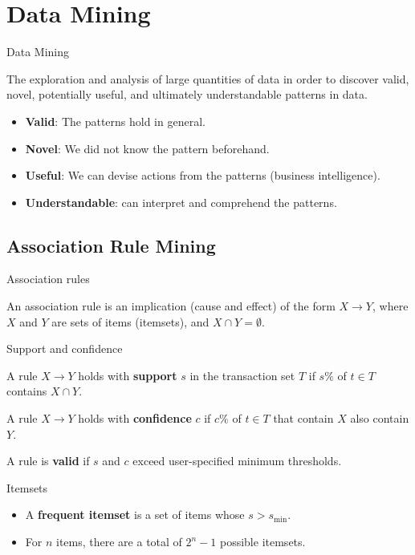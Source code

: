 \section{Data Mining}

\begin{definition}
    {Data Mining}

    The exploration and analysis of large quantities of data in order to discover valid, novel, potentially useful, and ultimately understandable patterns in data.

    \begin{itemize}
        \item \textbf{Valid}: The patterns hold in general.
        \item \textbf{Novel}: We did not know the pattern beforehand.
        \item \textbf{Useful}: We can devise actions from the patterns (business intelligence).
        \item \textbf{Understandable}: can interpret and comprehend the patterns.
    \end{itemize}

\end{definition}

\subsection{Association Rule Mining}

\begin{knBox}
    {Association rules}

    An association rule is an implication (cause and effect) of the form $X \rightarrow Y$, where $X$ and $Y$ are sets of items (itemsets), and $X \cap Y = \emptyset$.
\end{knBox}

\begin{definition}
    {Support and confidence}

    A rule $X \to Y$ holds with \textbf{support} $s$ in the transaction set $T$ if $s\%$ of $t \in T$ contains $X \cap Y$.

    A rule $X \to Y$ holds with \textbf{confidence} $c$ if $c\%$ of $t \in T$ that contain $X$ also contain $Y$.

    A rule is \textbf{valid} if $s$ and $c$ exceed user-specified minimum thresholds.
\end{definition}

\begin{definition}
    {Itemsets}

    \begin{itemize}
        \item A \textbf{frequent itemset} is a set of items whose $s > s_\text{min}$.
        \item For $n$ items, there are a total of $2^n - 1$ possible itemsets.
    \end{itemize}
\end{definition}

